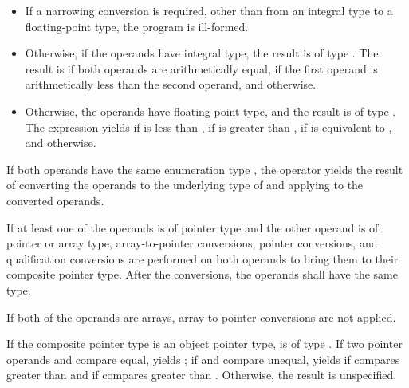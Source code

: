 \begin{itemize}
\item
If a narrowing conversion is required,
other than from an integral type to a floating-point type,
the program is ill-formed.

\item
Otherwise, if the operands have integral type,
the result is of type .
The result is
if both operands are arithmetically equal,
if the first operand is arithmetically
less than the second operand,
and
otherwise.
\item
Otherwise, the operands have floating-point type, and
the result is of type .
The expression  yields
if  is less than ,
if  is greater than ,
if  is equivalent to ,
and
 otherwise.
\end{itemize}

\pnum
If both operands have the same enumeration type ,
the operator yields the result of
converting the operands to the underlying type of 
and applying \tcode{<=>} to the converted operands.

\pnum
If at least one of the operands is of pointer type and
the other operand is of pointer or array type,
array-to-pointer conversions,
pointer conversions,
and
qualification conversions
are performed on both operands
to bring them to their composite pointer type.
After the conversions, the operands shall have the same type.
\begin{note}
If both of the operands are arrays,
array-to-pointer conversions are not applied.
\end{note}

\pnum
If the composite pointer type is an object pointer type,
 is of type .
If two pointer operands  and  compare equal,
 yields ;
if  and  compare unequal,
 yields
if  compares greater than 
and
if  compares greater than .
Otherwise, the result is unspecified.

